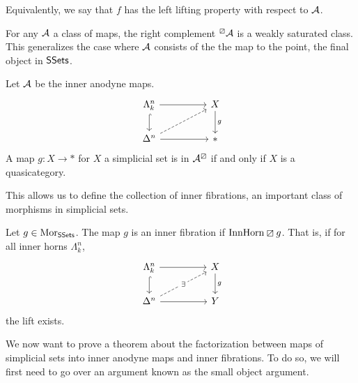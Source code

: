 \begin{remark}
  Equivalently, we say that $f$ has the left lifting property with respect to $\mathcal{A}$. 
\end{remark}
For any $\mathcal{A}$ a class of maps, the right complement $^{\boxslash}\mathcal{A}$ is a weakly saturated class. This generalizes the case where $\mathcal{A}$ consists of the the map to the point, the final object in $\mathsf{SSets}$. 
\begin{example}
  Let $\mathcal{A}$ be the inner anodyne maps. 
  $$%
  \begin{tikzcd}
    {\Lambda^{n}_{k}} && X \\
    {\Delta^{n}} && {*}
    \arrow["g", from=1-3, to=2-3]
    \arrow[hook, from=1-1, to=2-1]
    \arrow[from=1-1, to=1-3]
    \arrow[from=2-1, to=2-3]
    \arrow[dashed, from=2-1, to=1-3]
  \end{tikzcd}$$
  A map $g:X\to *$ for $X$ a simplicial set is in $\mathcal{A}^{\boxslash}$ if and only if $X$ is a quasicategory. 
\end{example}
This allows us to define the collection of inner fibrations, an important class of morphisms in simplicial sets. 
\begin{definition}\label{def: inner fibration}
  Let $g\in\mathrm{Mor}_{\mathsf{SSets}}$. The map $g$ is an inner fibration if $\mathrm{InnHorn}\boxslash g$. That is, if for all inner horns $\Lambda^{n}_{k}$,  
  $$%
  \begin{tikzcd}
    {\Lambda^{n}_{k}} && X \\
    {\Delta^{n}} && Y
    \arrow[hook, from=1-1, to=2-1]
    \arrow[from=1-1, to=1-3]
    \arrow[from=2-1, to=2-3]
    \arrow["\exists"{description}, dashed, from=2-1, to=1-3]
    \arrow["g", from=1-3, to=2-3]
  \end{tikzcd}$$
  the lift exists. 
\end{definition}
We now want to prove a theorem about the factorization between maps of simplicial sets into inner anodyne maps and inner fibrations. To do so, we will first need to go over an argument known as the small object argument. 
